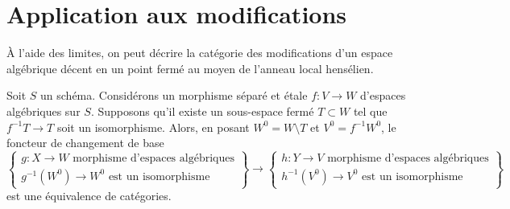 \section{Application aux modifications}
\label{section-modifications-at-a-point}

\noindent
À l'aide des limites, on peut décrire la catégorie des modifications d'un
espace algébrique décent en un point fermé au moyen de
l'anneau local hensélien.

\begin{lemma}
\label{lemma-excision-modifications}
Soit $S$ un schéma. Considérons un morphisme séparé et \'etale
$f : V \to W$ d'espaces algébriques sur $S$.
Supposons qu'il existe un
sous-espace fermé $T \subset W$ tel que $f^{-1}T \to T$ soit
un isomorphisme. Alors, en posant $W^0 = W \setminus T$ et
$V^0 = f^{-1}W^0$, le foncteur de changement de base
$$
\left\{
\begin{matrix}
g : X \to W\text{ morphisme d'espaces algébriques} \\
g^{-1}(W^0) \to W^0\text{ est un isomorphisme}
\end{matrix}
\right\}
\longrightarrow
\left\{
\begin{matrix}
h : Y \to V\text{ morphisme d'espaces algébriques} \\
h^{-1}(V^0) \to V^0\text{ est un isomorphisme}
\end{matrix}
\right\}
$$
est une équivalence de catégories.
\end{lemma}

